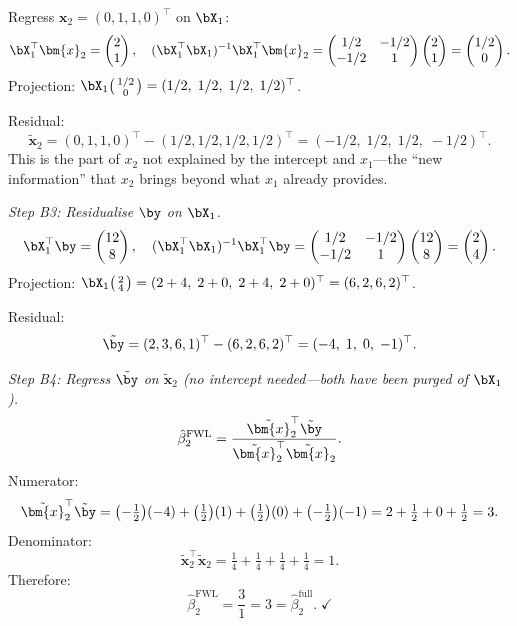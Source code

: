 \begin{example}
Regress $\bm{x}_2=(0,1,1,0)^\top$ on $\bX_1$:
\[
\bX_1^\top\bm{x}_2 = \begin{pmatrix}2\\1\end{pmatrix},\quad
(\bX_1^\top\bX_1)^{-1}\bX_1^\top\bm{x}_2
= \begin{pmatrix}1/2&-1/2\\-1/2&1\end{pmatrix}\begin{pmatrix}2\\1\end{pmatrix}
= \begin{pmatrix}1/2\\0\end{pmatrix}.
\]
Projection: $\bX_1\bigl(\begin{smallmatrix}1/2\\0\end{smallmatrix}\bigr)
= (1/2,\;1/2,\;1/2,\;1/2)^\top$.

Residual:
\[
\tilde{\bm{x}}_2 = (0,1,1,0)^\top - (1/2,1/2,1/2,1/2)^\top = (-1/2,\;1/2,\;1/2,\;-1/2)^\top.
\]
This is the part of $x_2$ not explained by the intercept and $x_1$---the ``new information'' that $x_2$ brings beyond what $x_1$ already provides.

\emph{Step B3: Residualise $\by$ on $\bX_1$.}
\[
\bX_1^\top\by = \begin{pmatrix}12\\8\end{pmatrix},\quad
(\bX_1^\top\bX_1)^{-1}\bX_1^\top\by = \begin{pmatrix}1/2&-1/2\\-1/2&1\end{pmatrix}\begin{pmatrix}12\\8\end{pmatrix}
= \begin{pmatrix}2\\4\end{pmatrix}.
\]
Projection: $\bX_1\bigl(\begin{smallmatrix}2\\4\end{smallmatrix}\bigr) = (2+4,\;2+0,\;2+4,\;2+0)^\top = (6,2,6,2)^\top$.

Residual:
\[
\tilde{\by} = (2,3,6,1)^\top - (6,2,6,2)^\top = (-4,\;1,\;0,\;-1)^\top.
\]

\emph{Step B4: Regress $\tilde{\by}$ on $\tilde{\bm{x}}_2$ (no intercept needed---both have been purged of $\bX_1$).}
\[
\hat\beta_2^{\text{FWL}} = \frac{\tilde{\bm{x}}_2^\top\tilde{\by}}{\tilde{\bm{x}}_2^\top\tilde{\bm{x}}_2}.
\]
Numerator:
\[
\tilde{\bm{x}}_2^\top\tilde{\by}
= \bigl(-\tfrac{1}{2}\bigr)(-4) + \bigl(\tfrac{1}{2}\bigr)(1) + \bigl(\tfrac{1}{2}\bigr)(0) + \bigl(-\tfrac{1}{2}\bigr)(-1)
= 2 + \tfrac{1}{2} + 0 + \tfrac{1}{2} = 3.
\]
Denominator:
\[
\tilde{\bm{x}}_2^\top\tilde{\bm{x}}_2
= \tfrac{1}{4}+\tfrac{1}{4}+\tfrac{1}{4}+\tfrac{1}{4} = 1.
\]
Therefore:
\[
\boxed{\hat\beta_2^{\text{FWL}} = \frac{3}{1} = 3 = \hat\beta_2^{\text{full}}.}\;\checkmark
\]


\end{example}
